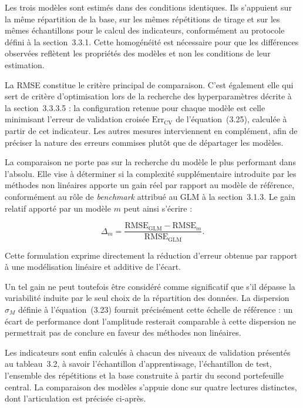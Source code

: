 Les trois modèles sont estimés dans des conditions identiques. Ils s'appuient sur la même 
répartition de la base, sur les mêmes répétitions de tirage et sur les mêmes échantillons 
pour le calcul des indicateurs, conformément au protocole défini à la section~3.3.1. Cette 
homogénéité est nécessaire pour que les différences observées reflètent les propriétés des 
modèles et non les conditions de leur estimation.

La RMSE constitue le critère principal de comparaison. C'est également elle qui sert de 
critère d'optimisation lors de la recherche des hyperparamètres décrite à la 
section~3.3.3.5 : la configuration retenue pour chaque modèle est celle minimisant l'erreur 
de validation croisée $\text{Err}_{\text{CV}}$ de l'équation~(3.25), calculée à partir de 
cet indicateur. Les autres mesures interviennent en complément, afin de préciser la nature 
des erreurs commises plutôt que de départager les modèles.

La comparaison ne porte pas sur la recherche du modèle le plus performant dans l'absolu. 
Elle vise à déterminer si la complexité supplémentaire introduite par les méthodes non 
linéaires apporte un gain réel par rapport au modèle de référence, conformément au rôle de 
\textit{benchmark} attribué au GLM à la section~3.1.3. Le gain relatif apporté par un 
modèle $m$ peut ainsi s'écrire :

\begin{equation}
\Delta_m = \frac{\text{RMSE}_{\text{GLM}} - \text{RMSE}_m}{\text{RMSE}_{\text{GLM}}}.
\label{eq:gain-relatif}
\end{equation}

Cette formulation exprime directement la réduction d'erreur obtenue par rapport à une 
modélisation linéaire et additive de l'écart.

Un tel gain ne peut toutefois être considéré comme significatif que s'il dépasse la 
variabilité induite par le seul choix de la répartition des données. La dispersion 
$\hat{\sigma}_M$ définie à l'équation~(3.23) fournit précisément cette échelle de 
référence : un écart de performance dont l'amplitude resterait comparable à cette 
dispersion ne permettrait pas de conclure en faveur des méthodes non linéaires.

Les indicateurs sont enfin calculés à chacun des niveaux de validation présentés au 
tableau~3.2, à savoir l'échantillon d'apprentissage, l'échantillon de test, l'ensemble des 
répétitions et la base construite à partir du second portefeuille central. La comparaison 
des modèles s'appuie donc sur quatre lectures distinctes, dont l'articulation est précisée 
ci-après.

